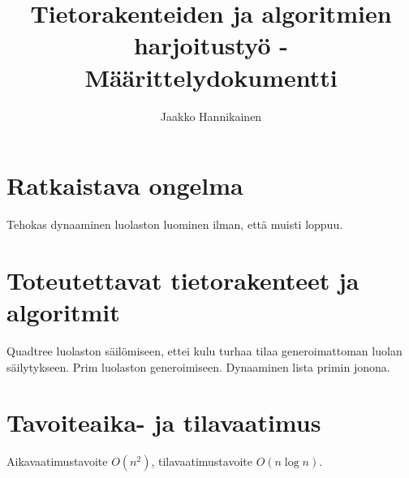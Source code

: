 \documentclass{article}
\author{Jaakko Hannikainen}
\title{Tietorakenteiden ja algoritmien harjoitustyö - Määrittelydokumentti}
\begin{document}
\maketitle

\section{Ratkaistava ongelma}
Tehokas dynaaminen luolaston luominen ilman, että muisti loppuu.

\section{Toteutettavat tietorakenteet ja algoritmit}
Quadtree luolaston säilömiseen, ettei kulu turhaa tilaa generoimattoman luolan
säilytykseen.
Prim luolaston generoimiseen.
Dynaaminen lista primin jonona.

\section{Tavoiteaika- ja tilavaatimus}
Aikavaatimustavoite $O(n^2)$, tilavaatimustavoite $O(n \log n)$.
\end{document}
